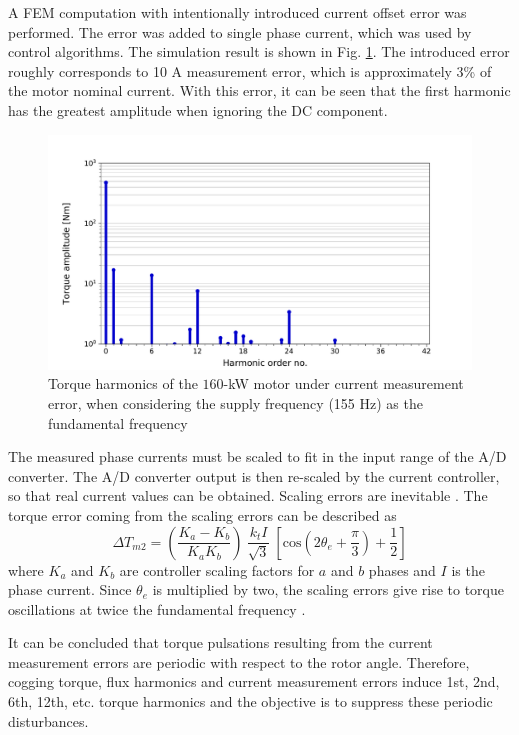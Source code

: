 A FEM computation with intentionally introduced current offset error was performed. The error was added to single phase current, which was used by control algorithms. The simulation result is shown in Fig. \ref{FEM_current-meas-error}. The introduced error roughly corresponds to 10 A measurement error, which is approximately 3\% of the motor nominal current. With this error, it can be seen that the first harmonic has the greatest amplitude when ignoring the DC component.
\begin{figure}[htb] 
    \centering
    \includegraphics[width=1.0\linewidth]{images/current-measurement-error.pdf} 
    \caption{Torque harmonics of the $160$-kW motor under current measurement error, when considering the supply frequency (155 Hz) as the fundamental frequency}
    \label{FEM_current-meas-error}
\end{figure}

The measured phase currents must be scaled to fit in the input range of the A/D converter. The A/D converter output is then re-scaled by the current controller, so that real current values can be obtained. Scaling errors are inevitable \cite{current_scaling:1998}. The torque error coming from the scaling errors can be described as \cite{current_scaling:1998, ILC:2005}
\begin{equation}
    \Delta T_{m2} = \left(\frac{K_a - K_b}{K_a K_b}\right) \: \frac{k_t I}{\sqrt{3}} \: \left[\text{cos}\left(2 \theta_e + \frac{\pi}{3}\right)+ \frac{1}{2}\right]
\end{equation}
where $K_a$ and $K_b$ are controller scaling factors for $a$ and $b$ phases and $I$ is the phase current. Since $\theta_e$ is multiplied by two, the scaling errors give rise to torque oscillations at twice the fundamental frequency \cite{current_scaling:1998, ILC:2005, CTR_SW:1998, ILC:2018}.

It can be concluded that torque pulsations resulting from the current measurement errors are periodic with respect to the rotor angle. Therefore, cogging torque, flux harmonics and current measurement errors induce 1st, 2nd, 6th, 12th, etc. torque harmonics and the objective is to suppress these periodic disturbances.

\clearpage
